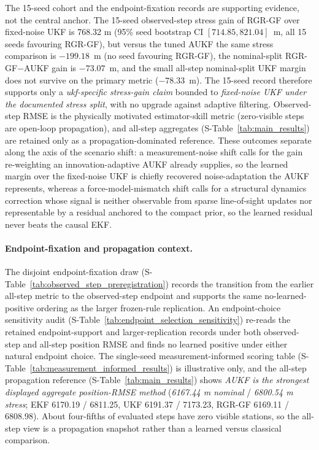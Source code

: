 \documentclass{article}
\begin{document}
The 15-seed cohort and the endpoint-fixation records are supporting evidence, not the central anchor. The 15-seed observed-step stress gain of RGR-GF over fixed-noise UKF is 768.32 m (95\% seed bootstrap CI $[714.85, 821.04]$~m, all 15 seeds favouring RGR-GF), but versus the tuned AUKF the same stress comparison is $-199.18$~m (no seed favouring RGR-GF), the nominal-split RGR-GF$-$AUKF gain is $-73.07$~m, and the small all-step nominal-split UKF margin does not survive on the primary metric ($-78.33$~m). The 15-seed record therefore supports only a \emph{ukf-specific stress-gain claim} bounded to \emph{fixed-noise UKF under the documented stress split}, with no upgrade against adaptive filtering. Observed-step RMSE is the physically motivated estimator-skill metric (zero-visible steps are open-loop propagation), and all-step aggregates (S-Table~\ref{tab:main_results}) are retained only as a propagation-dominated reference. These outcomes separate along the axis of the scenario shift: a measurement-noise shift calls for the gain re-weighting an innovation-adaptive AUKF already supplies, so the learned margin over the fixed-noise UKF is chiefly recovered noise-adaptation the AUKF represents, whereas a force-model-mismatch shift calls for a structural dynamics correction whose signal is neither observable from sparse line-of-sight updates nor representable by a residual anchored to the compact prior, so the learned residual never beats the causal EKF.

\paragraph{Endpoint-fixation and propagation context.}
The disjoint endpoint-fixation draw (S-Table~\ref{tab:observed_step_preregistration}) records the transition from the earlier all-step metric to the observed-step endpoint and supports the same no-learned-positive ordering as the larger frozen-rule replication. An endpoint-choice sensitivity audit (S-Table~\ref{tab:endpoint_selection_sensitivity}) re-reads the retained endpoint-support and larger-replication records under both observed-step and all-step position RMSE and finds no learned positive under either natural endpoint choice. The single-seed measurement-informed scoring table (S-Table~\ref{tab:measurement_informed_results}) is illustrative only, and the all-step propagation reference (S-Table~\ref{tab:main_results}) shows \emph{AUKF is the strongest displayed aggregate position-RMSE method} (\emph{6167.44 m nominal} / \emph{6800.54 m stress}; EKF 6170.19 / 6811.25, UKF 6191.37 / 7173.23, RGR-GF 6169.11 / 6808.98). About four-fifths of evaluated steps have zero visible stations, so the all-step view is a propagation snapshot rather than a learned versus classical comparison.
\end{document}
